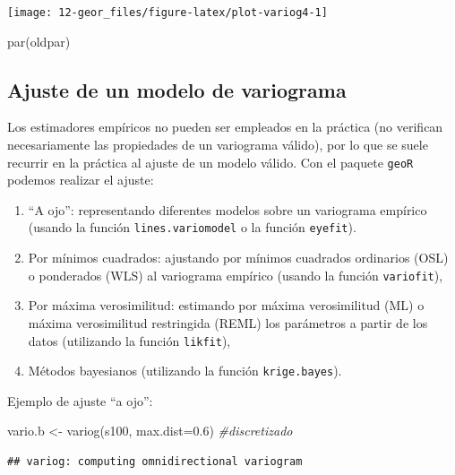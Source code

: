 \documentclass[
  spanish,
]{book}
\newenvironment{Shaded}{\begin{snugshade}}{\end{snugshade}}
\newcommand{\AttributeTok}[1]{\textcolor[rgb]{0.77,0.63,0.00}{#1}}
\newcommand{\CommentTok}[1]{\textcolor[rgb]{0.56,0.35,0.01}{\textit{#1}}}
\newcommand{\FloatTok}[1]{\textcolor[rgb]{0.00,0.00,0.81}{#1}}
\newcommand{\FunctionTok}[1]{\textcolor[rgb]{0.00,0.00,0.00}{#1}}
\newcommand{\NormalTok}[1]{#1}
\newcommand{\OtherTok}[1]{\textcolor[rgb]{0.56,0.35,0.01}{#1}}
\theoremstyle{break}
\theoremstyle{definition}
\theoremstyle{definition}
\theoremstyle{definition}
\theoremstyle{definition}
\theoremstyle{remark}
\begin{document}
\begin{center}\texttt{[image: 12-geor\_files/figure-latex/plot-variog4-1]} \end{center}

\begin{Shaded}
\begin{Highlighting}[]
\FunctionTok{par}\NormalTok{(oldpar)}
\end{Highlighting}
\end{Shaded}

\hypertarget{geor-ajuste}{%
\subsection{Ajuste de un modelo de variograma}\label{geor-ajuste}}

Los estimadores empíricos no pueden ser empleados en la práctica (no
verifican necesariamente las propiedades de un variograma válido), por
lo que se suele recurrir en la práctica al ajuste de un modelo válido.
Con el paquete \texttt{geoR} podemos realizar el ajuste:

\begin{enumerate}
\def\labelenumi{\arabic{enumi}.}
\item
  ``A ojo'': representando diferentes modelos sobre un variograma
  empírico (usando la función \texttt{lines.variomodel} o la función
  \texttt{eyefit}).
\item
  Por mínimos cuadrados: ajustando por mínimos cuadrados
  ordinarios (OSL) o ponderados (WLS) al variograma empírico (usando
  la función \texttt{variofit}),
\item
  Por máxima verosimilitud: estimando por máxima verosimilitud (ML) o
  máxima verosimilitud restringida (REML) los parámetros a partir de
  los datos (utilizando la función \texttt{likfit}),
\item
  Métodos bayesianos (utilizando la función \texttt{krige.bayes}).
\end{enumerate}

Ejemplo de ajuste ``a ojo'':

\begin{Shaded}
\begin{Highlighting}[]
\NormalTok{vario.b }\OtherTok{\textless{}{-}} \FunctionTok{variog}\NormalTok{(s100, }\AttributeTok{max.dist=}\FloatTok{0.6}\NormalTok{) }\CommentTok{\#discretizado}
\end{Highlighting}
\end{Shaded}

\begin{verbatim}
## variog: computing omnidirectional variogram
\end{verbatim}
\end{document}
